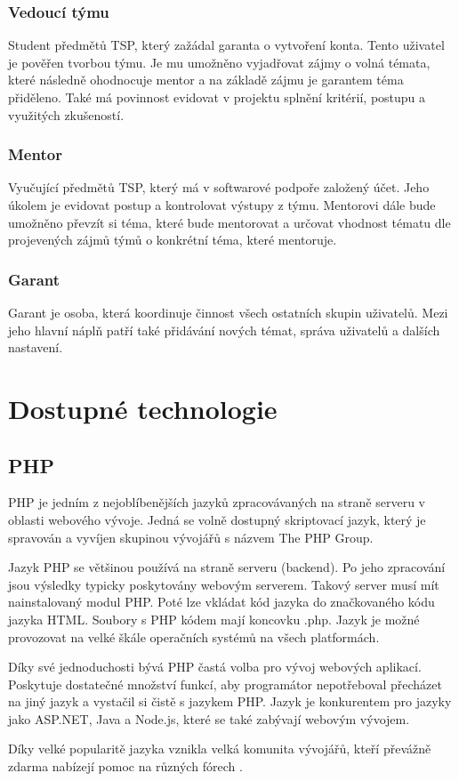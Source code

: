 \documentclass[czech,BP]{thesiskiv}
\begin{document}
	\subsection{Vedoucí týmu}
		\par Student předmětů TSP, který zažádal garanta o vytvoření konta. Tento uživatel je pověřen tvorbou týmu. Je mu umožněno vyjadřovat zájmy o volná témata, které následně ohodnocuje mentor a na základě zájmu je garantem téma přiděleno. Také má povinnost evidovat v projektu splnění kritérií, postupu a využitých zkušeností.
	\subsection{Mentor}
		\par Vyučující předmětů TSP, který má v softwarové podpoře založený účet. Jeho úkolem je evidovat postup a kontrolovat výstupy z týmu. Mentorovi dále bude umožněno převzít si téma, které bude mentorovat a určovat vhodnost tématu dle projevených zájmů týmů o konkrétní téma, které mentoruje.
	\subsection{Garant}
		\par Garant je osoba, která koordinuje činnost všech ostatních skupin uživatelů. Mezi jeho hlavní náplň patří také přidávání nových témat, správa uživatelů a dalších nastavení.

\chapter{Dostupné technologie}
\section{PHP}
\par PHP je jedním z nejoblíbenějších jazyků zpracovávaných na straně serveru v oblasti webového vývoje. Jedná se volně dostupný skriptovací jazyk, který je spravován a vyvíjen skupinou vývojářů s názvem The PHP Group.
\par Jazyk PHP se většinou používá na straně serveru (backend). Po jeho zpracování jsou výsledky typicky poskytovány webovým serverem. Takový server musí mít nainstalovaný modul PHP. Poté lze vkládat kód jazyka do značkovaného kódu jazyka HTML. Soubory s PHP kódem mají koncovku .php. Jazyk je možné provozovat na velké škále operačních systémů na všech platformách.
\par Díky své jednoduchosti bývá PHP častá volba pro vývoj webových aplikací. Poskytuje dostatečné množství funkcí, aby programátor nepotřeboval přecházet na jiný jazyk a vystačil si čistě s jazykem PHP. Jazyk je konkurentem pro jazyky jako ASP.NET, Java a Node.js, které se také zabývají webovým vývojem.
\par Díky velké popularitě jazyka vznikla velká komunita vývojářů, kteří převážně zdarma nabízejí pomoc na různých fórech \cite{PHPOkamzite}.
\end{document}
